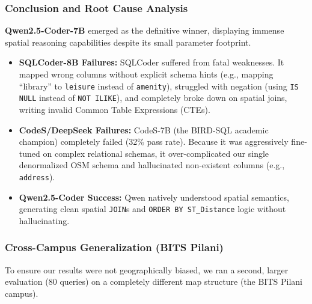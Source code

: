 \documentclass[11pt,a4paper]{article}
\begin{document}
\begin{table}[H]
\centering
{}
\caption{Overall Text-to-SQL Performance Comparison}
\end{table}

\subsubsection{Conclusion and Root Cause Analysis}
\textbf{Qwen2.5-Coder-7B} emerged as the definitive winner, displaying immense spatial reasoning capabilities despite its small parameter footprint. 
\begin{itemize}
    \item \textbf{SQLCoder-8B Failures:} SQLCoder suffered from fatal weaknesses. It mapped wrong columns without explicit schema hints (e.g., mapping ``library'' to \texttt{leisure} instead of \texttt{amenity}), struggled with negation (using \texttt{IS NULL} instead of \texttt{NOT ILIKE}), and completely broke down on spatial joins, writing invalid Common Table Expressions (CTEs).
    \item \textbf{CodeS/DeepSeek Failures:} CodeS-7B (the BIRD-SQL academic champion) completely failed (32\% pass rate). Because it was aggressively fine-tuned on complex relational schemas, it over-complicated our single denormalized OSM schema and hallucinated non-existent columns (e.g., \texttt{address}).
    \item \textbf{Qwen2.5-Coder Success:} Qwen natively understood spatial semantics, generating clean spatial \texttt{JOIN}s and \texttt{ORDER BY ST\_Distance} logic without hallucinating.
\end{itemize}

\subsubsection{Cross-Campus Generalization (BITS Pilani)}
To ensure our results were not geographically biased, we ran a second, larger evaluation (80 queries) on a completely different map structure (the BITS Pilani campus). 
\end{document}
